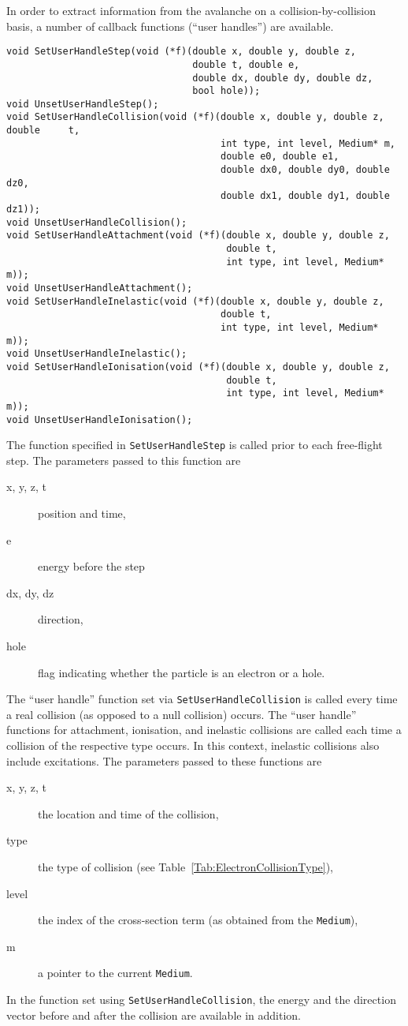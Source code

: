 In order to extract information from the avalanche on a collision-by-collision basis, a number of callback functions (``user handles'') are available. 
\begin{lstlisting}
void SetUserHandleStep(void (*f)(double x, double y, double z,
                                 double t, double e,
                                 double dx, double dy, double dz,
                                 bool hole));
void UnsetUserHandleStep();
void SetUserHandleCollision(void (*f)(double x, double y, double z, double     t,
                                      int type, int level, Medium* m,
                                      double e0, double e1,
                                      double dx0, double dy0, double dz0,
                                      double dx1, double dy1, double dz1));
void UnsetUserHandleCollision();
void SetUserHandleAttachment(void (*f)(double x, double y, double z,
                                       double t,
                                       int type, int level, Medium* m));
void UnsetUserHandleAttachment();
void SetUserHandleInelastic(void (*f)(double x, double y, double z,
                                      double t,
                                      int type, int level, Medium* m));
void UnsetUserHandleInelastic();
void SetUserHandleIonisation(void (*f)(double x, double y, double z,
                                       double t,
                                       int type, int level, Medium* m));
void UnsetUserHandleIonisation();
\end{lstlisting}
The function specified in \texttt{SetUserHandleStep} is called 
prior to each free-flight step. 
The parameters passed to this function are 
\begin{description}
  \item[x, y, z, t] 
  position and time, 
  \item[e]
  energy before the step
  \item[dx, dy, dz] 
  direction,
  \item[hole]
  flag indicating whether the particle is an electron or a hole.
\end{description}  
The ``user handle'' function set via \texttt{SetUserHandleCollision} 
is called every time a real collision (as opposed to a null collision) occurs.
The ``user handle'' functions for attachment, ionisation, and inelastic collisions 
are called each time a collision of the respective type occurs.  
In this context, inelastic collisions also include excitations. 
The parameters passed to these functions are 
\begin{description}
  \item[x, y, z, t]
  the location and time of the collision, 
  \item[type]
  the type of collision (see Table~\ref{Tab:ElectronCollisionType}), 
  \item[level]
  the index of the cross-section term (as obtained from the \texttt{Medium}),
  \item[m]
   a pointer to the current \texttt{Medium}. 
\end{description}
In the function set using \texttt{SetUserHandleCollision}, the energy 
and the direction vector before and after the collision are available 
in addition. 

